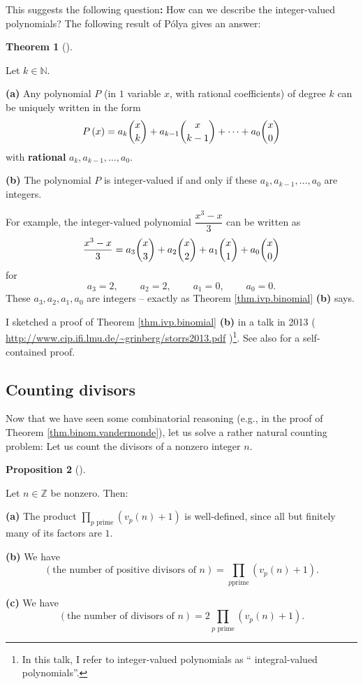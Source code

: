 \documentclass[numbers=enddot,12pt,final,onecolumn,notitlepage]{scrartcl}%
\numberwithin{exer}{subsection}
\theoremstyle{definition}
\newtheorem{theo}{Theorem}[subsection]
\newenvironment{theorem}[1][]
{\begin{theo}[#1]\begin{leftbar}}
{\end{leftbar}\end{theo}}
\newtheorem{prop}[theo]{Proposition}
\newenvironment{proposition}[1][]
{\begin{prop}[#1]\begin{leftbar}}
{\end{leftbar}\end{prop}}
\let\prodnonlimits\prod
\renewcommand{\prod}{\prodnonlimits\limits}
\begin{document}
This suggests the following question\textbf{:} How can we describe the
integer-valued polynomials? The following result of P\'{o}lya \cite{Polya19}
gives an answer:

\begin{theorem}
\label{thm.ivp.binomial}Let $k\in\mathbb{N}$.

\textbf{(a)} Any polynomial $P$ (in $1$ variable $x$, with rational
coefficients) of degree $k$ can be uniquely written in the form%
\[
P\left(  x\right)  =a_{k}\dbinom{x}{k}+a_{k-1}\dbinom{x}{k-1}+\cdots
+a_{0}\dbinom{x}{0}%
\]
with \textbf{rational} $a_{k},a_{k-1},\ldots,a_{0}$.

\textbf{(b)} The polynomial $P$ is integer-valued if and only if these
$a_{k},a_{k-1},\ldots,a_{0}$ are integers.
\end{theorem}

For example, the integer-valued polynomial $\dfrac{x^{3}-x}{3}$ can be written
as%
\[
\dfrac{x^{3}-x}{3}=a_{3}\dbinom{x}{3}+a_{2}\dbinom{x}{2}+a_{1}\dbinom{x}%
{1}+a_{0}\dbinom{x}{0}%
\]
for
\[
a_{3}=2,\ \ \ \ \ \ \ \ \ \ a_{2}=2,\ \ \ \ \ \ \ \ \ \ a_{1}%
=0,\ \ \ \ \ \ \ \ \ \ a_{0}=0.
\]
These $a_{3},a_{2},a_{1},a_{0}$ are integers -- exactly as Theorem
\ref{thm.ivp.binomial} \textbf{(b)} says.

I sketched a proof of Theorem \ref{thm.ivp.binomial} \textbf{(b)} in a talk in
2013 ( \url{http://www.cip.ifi.lmu.de/~grinberg/storrs2013.pdf} )\footnote{In
this talk, I refer to integer-valued polynomials as \textquotedblleft
integral-valued polynomials\textquotedblright.}. See also \cite{daSilv12} for
a self-contained proof.

\subsection{Counting divisors}

Now that we have seen some combinatorial reasoning (e.g., in the proof of
Theorem \ref{thm.binom.vandermonde}), let us solve a rather natural counting
problem: Let us count the divisors of a nonzero integer $n$.

\begin{proposition}
\label{prop.ent.count-divs}Let $n\in\mathbb{Z}$ be nonzero. Then:

\textbf{(a)} The product $\prod_{p\text{ prime}}\left(  v_{p}\left(  n\right)
+1\right)  $ is well-defined, since all but finitely many of its factors are
$1$.

\textbf{(b)} We have
\[
\left(  \text{the number of positive divisors of }n\right)  =\prod_{p\text{
prime}}\left(  v_{p}\left(  n\right)  +1\right)  .
\]


\textbf{(c)} We have%
\[
\left(  \text{the number of divisors of }n\right)  =2\prod_{p\text{ prime}%
}\left(  v_{p}\left(  n\right)  +1\right)  .
\]

\end{proposition}
\end{document}
